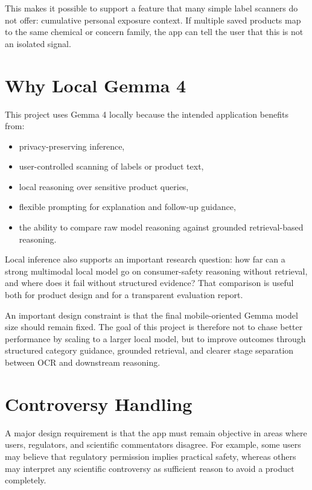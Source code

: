 \documentclass[11pt]{article}
\begin{document}
This makes it possible to support a feature that many simple label scanners do not offer: cumulative personal exposure context. If multiple saved products map to the same chemical or concern family, the app can tell the user that this is not an isolated signal.

\section{Why Local Gemma 4}

This project uses Gemma 4 locally because the intended application benefits from:

\begin{itemize}[leftmargin=1.5em]
\item privacy-preserving inference,
\item user-controlled scanning of labels or product text,
\item local reasoning over sensitive product queries,
\item flexible prompting for explanation and follow-up guidance,
\item the ability to compare raw model reasoning against grounded retrieval-based reasoning.
\end{itemize}

Local inference also supports an important research question: how far can a strong multimodal local model go on consumer-safety reasoning without retrieval, and where does it fail without structured evidence? That comparison is useful both for product design and for a transparent evaluation report.

An important design constraint is that the final mobile-oriented Gemma model size should remain fixed. The goal of this project is therefore not to chase better performance by scaling to a larger local model, but to improve outcomes through structured category guidance, grounded retrieval, and clearer stage separation between OCR and downstream reasoning.

\section{Controversy Handling}

A major design requirement is that the app must remain objective in areas where users, regulators, and scientific commentators disagree. For example, some users may believe that regulatory permission implies practical safety, whereas others may interpret any scientific controversy as sufficient reason to avoid a product completely.
\end{document}
